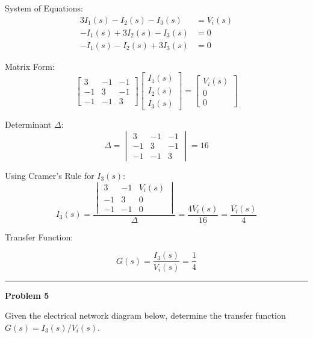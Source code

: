 \documentclass[11pt]{article}
\begin{document}
{System of Equations:}
\[
\begin{aligned}
3I_1(s) - I_2(s) - I_3(s) &= V_i(s) \\
-I_1(s) + 3I_2(s) - I_3(s) &= 0 \\
-I_1(s) - I_2(s) + 3I_3(s) &= 0
\end{aligned}
\]

{Matrix Form:}
\[
\begin{bmatrix}
3 & -1 & -1 \\
-1 & 3 & -1 \\
-1 & -1 & 3
\end{bmatrix}
\begin{bmatrix}
I_1(s) \\ I_2(s) \\ I_3(s)
\end{bmatrix}
=
\begin{bmatrix}
V_i(s) \\ 0 \\ 0
\end{bmatrix}
\]

{Determinant \(\Delta\):}
\[
\Delta =
\begin{vmatrix}
3 & -1 & -1 \\
-1 & 3 & -1 \\
-1 & -1 & 3
\end{vmatrix}
= 16
\]

{Using Cramer's Rule for \(I_3(s)\):}
\[
I_3(s) =
\frac{
\begin{vmatrix}
3 & -1 & V_i(s) \\
-1 & 3 & 0 \\
-1 & -1 & 0
\end{vmatrix}
}
{\Delta}
= \frac{4V_i(s)}{16} = \frac{V_i(s)}{4}
\]


{Transfer Function:}

\[
\boxed{
G(s) = \frac{I_3(s)}{V_i(s)} = \frac{1}{4}
}
\]
\newpage
  \setcounter{page}{7}
\noindent\rule{\textwidth}{1pt}
\noindent\textbf{Problem 5} \hfill 

\noindent Given the electrical network diagram below, determine the transfer function $G(s) = I_3(s)/V_i(s)$.
\end{document}
